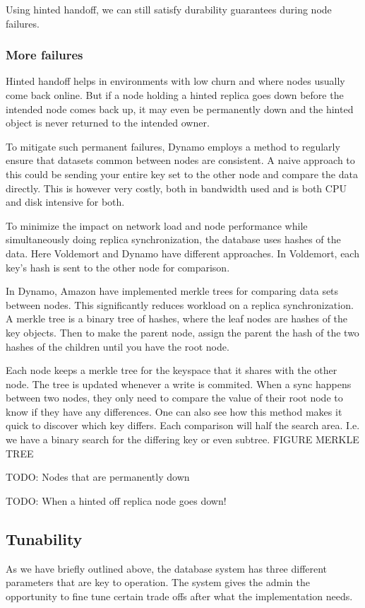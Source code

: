 Using hinted handoff, we can still satisfy durability guarantees during node failures.

\subsubsection{More failures}
Hinted handoff helps in environments with low churn and where nodes usually come back online. But if a node holding a hinted replica goes down before the intended node comes back up, it may even be permanently down and the hinted object is never returned to the intended owner.

To mitigate such permanent failures, Dynamo\cite{dynamo} employs a method to regularly ensure that datasets common between nodes are consistent. A naive approach to this could be sending your entire key set to the other node and compare the data directly.
This is however very costly, both in bandwidth used and is both CPU and disk intensive for both.

To minimize the impact on network load and node performance while simultaneously doing replica synchronization, the database uses hashes of the data. Here Voldemort and Dynamo have different approaches. In Voldemort, each key's hash is sent to the other node for comparison.

In Dynamo, Amazon have implemented merkle trees for comparing data sets between nodes. This significantly reduces workload on a replica synchronization.
A merkle tree is a binary tree of hashes, where the leaf nodes are hashes of the key objects.
Then to make the parent node, assign the parent the hash of the two hashes of the children until you have the root node. 

Each node keeps a merkle tree for the keyspace that it shares with the other node. The tree is updated whenever a write is commited.
When a sync happens between two nodes, they only need to compare the value of their root node to know if they have any differences.
One can also see how this method makes it quick to discover which key differs. Each comparison will half the search area.
I.e. we have a binary search for the differing key or even subtree.
FIGURE MERKLE TREE

TODO: Nodes that are permanently down

TODO: When a hinted off replica node goes down!

\subsection{Tunability}
As we have briefly outlined above, the database system has three different parameters that are key to operation.
The system gives the admin the opportunity to fine tune certain trade offs after what the implementation needs.

